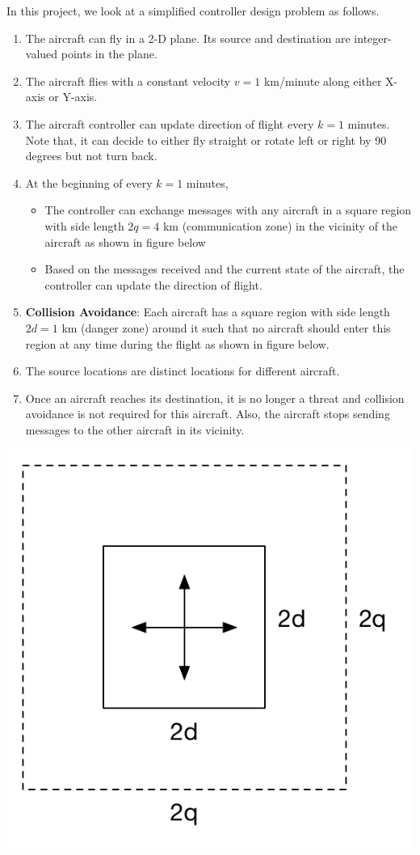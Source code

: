 \documentclass[11pt]{article}
\begin{document}
In this project, we look at a simplified controller design problem as follows. 
\begin{enumerate}
\item The aircraft can fly in a 2-D plane. Its source and destination are integer-valued points in the plane.
\item The aircraft flies with a constant velocity $v = 1$ km/minute along either X-axis or Y-axis. 
\item The aircraft controller can update direction of flight every $k = 1$ minutes. Note that, it can decide to either fly straight or rotate left or right by 90 degrees but not turn back. 
\item At the beginning of every $k = 1$ minutes, 
\begin{itemize}
\item The controller can exchange messages with any aircraft in a square region with side length $2q = 4$ km (communication zone) in the vicinity of the aircraft as shown in figure below
\item Based on the messages received and the current state of the aircraft, the controller can update the direction of flight.
\end{itemize}
\item {\bf Collision Avoidance}: Each aircraft has a square region with side length $2d = 1$ km (danger zone) around it such that no aircraft should enter this region at any time during the flight as shown in figure below. 
\item The source locations are distinct locations for different aircraft. 
\item Once an aircraft reaches its destination, it is no longer a threat and collision avoidance is not required for this aircraft. Also, the aircraft stops sending messages to the other aircraft in its vicinity. 
\end{enumerate}
\centerline{
 \includegraphics[scale=0.5]{figure.pdf}
}
\end{document}
